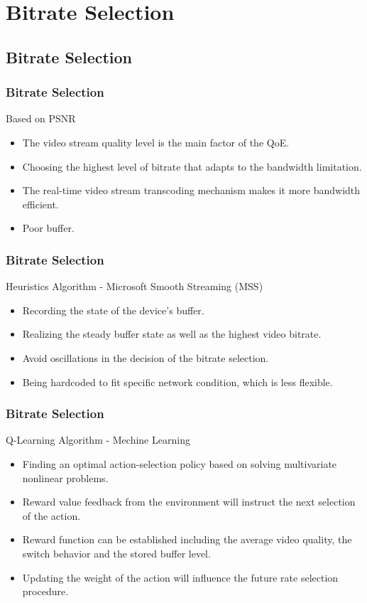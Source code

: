 \documentclass[table]{beamer}
\begin{document}
\section{Bitrate Selection}
\subsection{Bitrate Selection}
\begin{frame}
	\frametitle{Bitrate Selection}
	
	Based on PSNR
	\begin{itemize}
	\item The video stream quality level is the main factor of the QoE.
	\item Choosing the highest level of bitrate that adapts to the bandwidth limitation. 
	\item The real-time video stream transcoding mechanism makes it more bandwidth efficient. 
	\item Poor buffer.
	\end{itemize}
\end{frame}

\begin{frame}
	\frametitle{Bitrate Selection}
	
	Heuristics Algorithm - Microsoft Smooth Streaming (MSS)
	\begin{itemize}
	\item Recording the state of the device’s buffer.
	\item Realizing the steady buffer state as well as the highest video bitrate.
	\item Avoid oscillations in the decision of the bitrate selection.
	\item Being hardcoded to fit specific network condition, which is less flexible.
	\end{itemize}
\end{frame}

\begin{frame}
	\frametitle{Bitrate Selection}
	
	Q-Learning Algorithm - Mechine Learning
	\begin{itemize}
	\item Finding an optimal action-selection policy based on solving multivariate nonlinear problems.
	\item Reward value feedback from the environment will instruct the next selection of the action.
	\item Reward function can be established including the average video quality, the switch behavior and the stored buffer level.
	\item Updating the weight of the action will influence the future rate selection procedure. 
	\end{itemize}
\end{frame}
\end{document}
